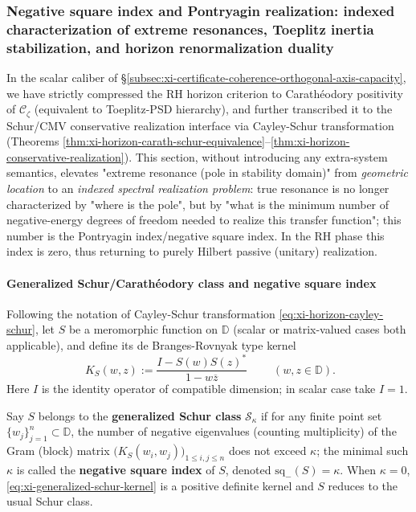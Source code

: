 \subsubsection{Negative square index and Pontryagin realization: indexed characterization of extreme resonances, Toeplitz inertia stabilization, and horizon renormalization duality}\label{subsubsec:xi-negative-square-index-pontryagin-realization}
In the scalar caliber of \S\ref{subsec:xi-certificate-coherence-orthogonal-axis-capacity}, we have strictly compressed the RH horizon criterion to
Carathéodory positivity of \(\mathscr{C}_{\zeta}\) (equivalent to Toeplitz-PSD hierarchy), and further transcribed it to the Schur/CMV conservative realization interface via Cayley-Schur transformation (Theorems \ref{thm:xi-horizon-carath-schur-equivalence}--\ref{thm:xi-horizon-conservative-realization}).
This section, without introducing any extra-system semantics, elevates "extreme resonance (pole in stability domain)" from \emph{geometric location} to an \emph{indexed spectral realization problem}:
true resonance is no longer characterized by "where is the pole", but by "what is the minimum number of negative-energy degrees of freedom needed to realize this transfer function"; this number is the Pontryagin index/negative square index.
In the RH phase this index is zero, thus returning to purely Hilbert passive (unitary) realization.

\paragraph{Generalized Schur/Carathéodory class and negative square index}
Following the notation of Cayley-Schur transformation \eqref{eq:xi-horizon-cayley-schur}, let \(S\) be a meromorphic function on \(\mathbb{D}\) (scalar or matrix-valued cases both applicable), and define its de Branges-Rovnyak type kernel
\begin{equation}\label{eq:xi-generalized-schur-kernel}
\boxed{\;
K_{S}(w,z):=\frac{I-S(w)S(z)^\ast}{1-w\overline{z}}\;}
\qquad(w,z\in\mathbb{D}).
\end{equation}
Here \(I\) is the identity operator of compatible dimension; in scalar case take \(I=1\).

\begin{definition}\label{def:xi-generalized-schur-negative-squares}
Say \(S\) belongs to the \textbf{generalized Schur class} \(\mathcal{S}_{\kappa}\) if for any finite point set \(\{w_j\}_{j=1}^{n}\subset\mathbb{D}\), the number of negative eigenvalues (counting multiplicity) of the Gram (block) matrix
\(
\bigl(K_S(w_i,w_j)\bigr)_{1\le i,j\le n}
\)
does not exceed \(\kappa\); the minimal such \(\kappa\) is called the \textbf{negative square index} of \(S\), denoted
\(\mathrm{sq}_-(S)=\kappa\).
When \(\kappa=0\), \eqref{eq:xi-generalized-schur-kernel} is a positive definite kernel and \(S\) reduces to the usual Schur class.
\end{definition}

